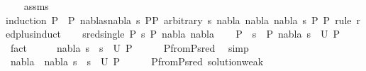 \begin{isabellebody}
%
\isadelimproof
\ \ %
\endisadelimproof
%
\isatagproof
{}\isamarkupfalse%
\ assms\isanewline
{}\isamarkupfalse%
{\isacharparenleft}{\kern0pt}induction\ P{}\ {\isasymequiv}\ {\isachardoublequoteopen}P{}{\isachardoublequoteclose}\ nablas{\isasymequiv}{\isachardoublequoteopen}{\isacharparenleft}{\kern0pt}nabla{\isacharcomma}{\kern0pt}\ s{\isacharparenright}{\kern0pt}{\isachardoublequoteclose}\ P{}{\isasymequiv}{\isachardoublequoteopen}P{}{\isachardoublequoteclose}\ arbitrary{\isacharcolon}{\kern0pt}\ s\ nabla{}\ nabla\ nabla{}\ s{}\ P{}\ P{}\ rule{\isacharcolon}{\kern0pt}\ red{\isacharunderscore}{\kern0pt}plus{\isachardot}{\kern0pt}induct{\isacharparenright}{\kern0pt}\isanewline
\ \ \isamarkupfalse%
\ {\isacharparenleft}{\kern0pt}sred{\isacharunderscore}{\kern0pt}single\ P{}\ s\ P{}\ nabla{}\ nabla{}{\isacharparenright}{\kern0pt}\isanewline
\ \ \isamarkupfalse%
\ {\isachardoublequoteopen}P{}\ {\isasymturnstile}\ s\ {\isasymleadsto}\ P{}{\isachardoublequoteclose}\ {\isachardoublequoteopen}{\isacharparenleft}{\kern0pt}nabla{}{\isacharcomma}{\kern0pt}\ s{}{\isacharparenright}{\kern0pt}\ {\isasymin}\ U\ P{}{\isachardoublequoteclose}\ \isamarkupfalse%
\ fact{\isacharplus}{\kern0pt}\isanewline
\ \ \isamarkupfalse%
\ \isamarkupfalse%
\ {\isachardoublequoteopen}{\isacharparenleft}{\kern0pt}nabla{}{\isacharcomma}{\kern0pt}\ s{}\ {\isasymbullet}\ s{\isacharparenright}{\kern0pt}\ {\isasymin}\ U\ P{}{\isachardoublequoteclose}\isanewline
\ \ \ \ \isamarkupfalse%
\ P{}{\isacharunderscore}{\kern0pt}from{\isacharunderscore}{\kern0pt}P{}{\isacharunderscore}{\kern0pt}sred\ \isamarkupfalse%
\ simp\isanewline
\ \ \isamarkupfalse%
\ \isamarkupfalse%
\ {\isachardoublequoteopen}{\isacharparenleft}{\kern0pt}nabla{}\ {\isasymunion}\ nabla{}{\isacharcomma}{\kern0pt}\ s{}\ {\isasymbullet}\ s{\isacharparenright}{\kern0pt}\ {\isasymin}\ U\ P{}{\isachardoublequoteclose}\isanewline
\ \ \ \ \isamarkupfalse%
\ P{}{\isacharunderscore}{\kern0pt}from{\isacharunderscore}{\kern0pt}P{}{\isacharunderscore}{\kern0pt}sred\ solution{\isacharunderscore}{\kern0pt}weak\ \isamarkupfalse%

\end{isabellebody}
